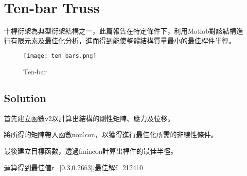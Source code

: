 \documentclass[12pt, a4paper]{article}
\begin{document}
\cfoot{\thepage}


\thispagestyle{fancy}

\section{Ten-bar Truss}

十桿衍架為典型衍架結構之一，此篇報告在特定條件下，利用Matlab對該結構進行有限元素及最佳化分析，進而得到能使整體結構質量最小的最佳桿件半徑。
\begin{figure}[!h] 
\texttt{[image: ten\_bars.png]} 
\centering
\caption[es]{Ten-bar}
\label{ES}
\end{figure}


\subsection*{Solution}
首先建立函數v2以計算出結構的剛性矩陣、應力及位移。


將所得的矩陣帶入函數nonlcon，以獲得進行最佳化所需的非線性條件。


最後建立目標函數，透過fmincon計算出桿件的最佳半徑。


運算得到最佳值r=[0.3,0.2663],最佳解f=212410
\end{document}
